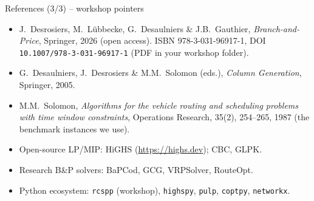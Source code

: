 \documentclass[10pt,aspectratio=169]{beamer}
\begin{document}
\begin{frame}{References (3/3) -- workshop pointers}
  \scriptsize
  \begin{itemize}\setlength{\itemsep}{2pt}
    \item J.~Desrosiers, M.~L\"ubbecke, G.~Desaulniers \& J.B.~Gauthier,
          \emph{Branch-and-Price}, Springer, 2026 (open access).
          ISBN 978-3-031-96917-1, DOI \texttt{10.1007/978-3-031-96917-1}
          (PDF in your workshop folder).
    \item G.~Desaulniers, J.~Desrosiers \& M.M.~Solomon (eds.),
          \emph{Column Generation}, Springer, 2005.
    \item M.M.~Solomon, \emph{Algorithms for the vehicle routing and
          scheduling problems with time window constraints}, Operations
          Research, 35(2), 254--265, 1987 (the benchmark instances we use).
    \item Open-source LP/MIP: HiGHS (\url{https://highs.dev}); CBC, GLPK.
    \item Research B\&P solvers: BaPCod, GCG, VRPSolver, RouteOpt.
    \item Python ecosystem: \texttt{rcspp} (workshop), \texttt{highspy},
          \texttt{pulp}, \texttt{coptpy}, \texttt{networkx}.
  \end{itemize}
\end{frame}
\end{document}
